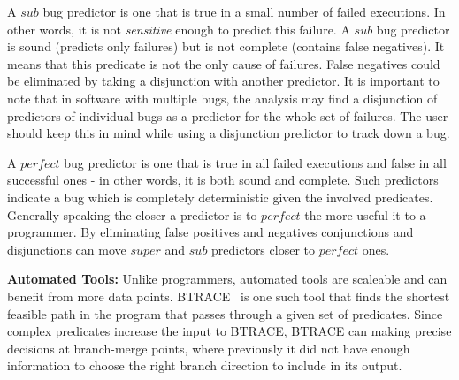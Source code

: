 A $sub$ bug predictor is one that is true in a small number of failed executions.  In other words, it is not {\em sensitive} enough to predict this failure.  A $sub$ bug predictor is sound (predicts only failures) but is not complete (contains false negatives).  It means that this predicate is not the only cause of failures.  False negatives could be eliminated by taking a disjunction with another predictor.  It is important to note that in software with multiple bugs, the analysis may find a disjunction of predictors of individual bugs as a predictor for the whole set of failures.  The user should keep this in mind while using a disjunction predictor to track down a bug.

A $perfect$ bug predictor is one that is true in all failed executions and false in all successful ones - in other words, it is both sound and complete.  Such predictors indicate a bug which is completely deterministic given the involved predicates.  Generally speaking the closer a predictor is to $perfect$ the more useful it to a programmer.  By eliminating false positives and negatives conjunctions and disjunctions can move $super$ and $sub$ predictors closer to $perfect$ ones.

\vspace{4pt} \noindent
{\bf Automated Tools:}  Unlike programmers, automated tools are scaleable and can benefit from more data points.  BTRACE~\cite{Lal:2006:POPAD} is one such tool that finds the shortest feasible path in the program that passes through a given set of predicates.  Since complex predicates increase the input to BTRACE, BTRACE can making precise decisions at branch-merge points, where previously it did not have enough information to choose the right branch direction to include in its output.
